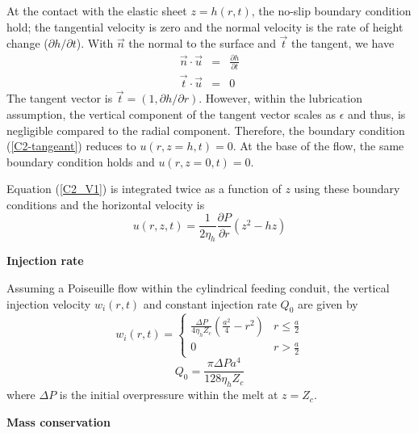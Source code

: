 At the contact with the elastic sheet $z=h(r,t)$, the no-slip boundary
condition  hold;  the  tangential  velocity is  zero  and  the  normal
velocity  is the  rate of  height change  ($\partial h/  \partial t$).
With $\vec{n}$ the normal to the surface and $\vec{t}$ the tangent, we
have
\begin{eqnarray}
  \vec{n} \cdot \vec{u} &=& \frac{\partial h }{\partial t}\\
  \vec{t} \cdot \vec{u} &=& 0 \label{C2-tangeant}
\end{eqnarray}
The  tangent  vector is  $\vec{t}  =  (1,  \partial h/  \partial  r)$.
However, within the lubrication  assumption, the vertical component of
the  tangent  vector scales  as  $\epsilon$  and thus,  is  negligible
compared to  the radial  component. Therefore, the  boundary condition
(\ref{C2-tangeant}) reduces  to $u(r,z=h,t) =0$.   At the base  of the
flow, the same boundary condition holds and $u(r,z=0,t) =0$.

Equation (\ref{C2_V1}) is integrated twice  as a function of $z$ using
these boundary conditions and the horizontal velocity is
\begin{equation}
  u(r,z,t) =\frac{1}{2\eta_h} \frac{\partial P}{\partial r} \left(z^2-hz\right)
  \label{C2-vel}
\end{equation}

\vspace{.5cm} \textbf{Injection rate} \vspace{.5cm}

Assuming a Poiseuille flow within the cylindrical feeding conduit, the
vertical  injection velocity  $w_i(r,t)$ and  constant injection  rate
$Q_0$ are given by
\begin{equation}
  w_i(r,t)=
  \begin{cases}
    \frac{ \Delta P}{4 \eta_h Z_{c}} (\frac{a^{2}}{4}-r^{2})& r \le \frac{a}{2}\\
    0 & r > \frac{a}{2}
  \end{cases}
  \label{C2-eq12}
\end{equation}
\begin{equation}
  Q_{0}=\frac{\pi \Delta P a^{4}}{128 \eta_h Z_c}
  \label{C2-eq11}
\end{equation}
where  $\Delta P$  is  the  initial overpressure  within  the melt  at
$z=Z_{c}$.

\vspace{.5cm} \textbf{Mass conservation} \vspace{.5cm}

